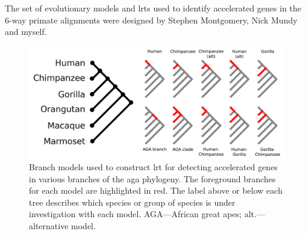 The set of evolutionary models and \acp{lrt} used to identify
accelerated genes in the 6-way primate alignments were designed by
Stephen Montgomery, Nick Mundy and myself.

\begin{figure}
\centering
\includegraphics[scale=0.5]{Figs/gorilla_branch_models.pdf}
\caption{Branch models used to construct \ac{lrt} for detecting
  accelerated genes in various branches of the \ac{aga} phylogeny. The
  foreground branches for each model are highlighted in red. The label
  above or below each tree describes which species or group of species
  is under investigation with each model. AGA---African great apes;
  alt.---alternative model.}
\label{fig_gorilla_branch_models}
\end{figure}

